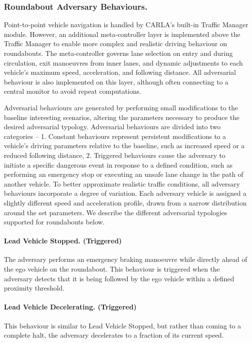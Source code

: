 \subsubsection{Roundabout Adversary Behaviours.}
Point-to-point vehicle navigation is handled by CARLA's built-in Traffic Manager module. However, an additional meta-controller layer is implemented above the Traffic Manager to enable more complex and realistic driving behaviour on roundabouts. The meta-controller governs lane selection on entry and during circulation, exit manoeuvres from inner lanes, and dynamic adjustments to each vehicle's maximum speed, acceleration, and following distance. All adversarial behaviour is also implemented on this layer, although often connecting to a central monitor to avoid repeat computations.

Adversarial behaviours are generated by performing small modifications to the baseline interesting scenarios, altering the parameters necessary to produce the desired adversarial typology.
Adversarial behaviours are divided into two categories -- 1. Constant behaviours represent persistent modifications to a vehicle's driving parameters relative to the baseline, such as increased speed or a reduced following distance, 2. Triggered behaviours cause the adversary to initiate a specific dangerous event in response to a defined condition, such as performing an emergency stop or executing an unsafe lane change in the path of another vehicle.
To better approximate realistic traffic conditions, all adversary behaviours incorporate a degree of variation. Each adversary vehicle is assigned a slightly different speed and acceleration profile, drawn from a narrow distribution around the set parameters. 
We describe the different adversarial typologies supported for roundabouts below. 


\paragraph{Lead Vehicle Stopped. (Triggered)}
The adversary performs an emergency braking manoeuvre while directly ahead of the ego vehicle on the roundabout. This behaviour is triggered when the adversary detects that it is being followed by the ego vehicle within a defined proximity threshold.

\paragraph{Lead Vehicle Decelerating. (Triggered)}
This behaviour is similar to Lead Vehicle Stopped, but rather than coming to a complete halt, the adversary decelerates to a fraction of its current speed.

